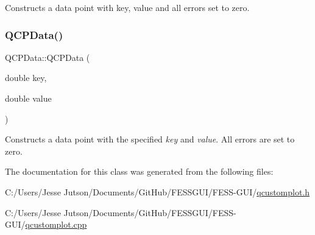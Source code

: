 Constructs a data point with key, value and all errors set to zero. \hypertarget{class_q_c_p_data_aa274181ae8de2a0907ba5464d3c2c103}{}\label{class_q_c_p_data_aa274181ae8de2a0907ba5464d3c2c103} 
\subsubsection{\texorpdfstring{Q\+C\+P\+Data()}{QCPData()}\hspace{0.1cm}{\footnotesize\ttfamily [2/2]}}
{\footnotesize\ttfamily Q\+C\+P\+Data\+::\+Q\+C\+P\+Data (\begin{DoxyParamCaption}\item[{double}]{key,  }\item[{double}]{value }\end{DoxyParamCaption})}

Constructs a data point with the specified {\itshape key} and {\itshape value}. All errors are set to zero. 

The documentation for this class was generated from the following files\+:\begin{DoxyCompactItemize}
\item 
C\+:/\+Users/\+Jesse Jutson/\+Documents/\+Git\+Hub/\+F\+E\+S\+S\+G\+U\+I/\+F\+E\+S\+S-\/\+G\+U\+I/\hyperlink{qcustomplot_8h}{qcustomplot.\+h}\item 
C\+:/\+Users/\+Jesse Jutson/\+Documents/\+Git\+Hub/\+F\+E\+S\+S\+G\+U\+I/\+F\+E\+S\+S-\/\+G\+U\+I/\hyperlink{qcustomplot_8cpp}{qcustomplot.\+cpp}\end{DoxyCompactItemize}
